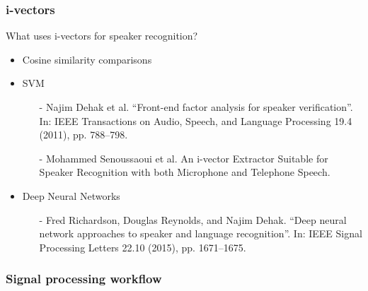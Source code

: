 \documentclass[11pt,english]{beamer}
\begin{document}
\begin{frame}
  \frametitle{i-vectors}
    What uses i-vectors for speaker recognition?
    \begin{itemize}
      \setlength\itemsep{1em}
    \item Cosine similarity comparisons
    \item SVM 
        \begin{itemize}
        \item[-] \footnotesize  Najim Dehak et al. “Front-end factor analysis for speaker verification”. In: IEEE Transactions on Audio, Speech, and Language Processing 19.4 (2011), pp. 788–798.
        \item[-] \footnotesize  Mohammed Senoussaoui et al. An i-vector Extractor Suitable for Speaker Recognition with both Microphone and Telephone Speech.
        \end{itemize}
    \item Deep Neural Networks
        \begin{itemize}
        \item[-] \footnotesize Fred Richardson, Douglas Reynolds, and Najim Dehak. “Deep neural network approaches to speaker and language recognition”. In: IEEE Signal Processing Letters 22.10 (2015), pp. 1671–1675.
        \end{itemize}
    \end{itemize}

    


\end{frame}

\begin{frame}
  \frametitle{Signal processing workflow}
    \centering
\end{frame}
\end{document}
